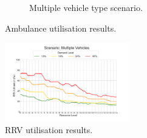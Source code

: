 \documentclass[preprint,12pt]{elsarticle}
\begin{document}
\begin{figure}
\begin{center}
\begin{subfigure}{0.48\textwidth}
    \caption{Multiple vehicle type scenario.}
    \label{fig:results_ambulance_utilisation_multiple} \end{subfigure}
    \end{center} \caption{Ambulance utilisation results.}
    \label{fig:results_ambulance_utilisation} \end{figure}

\begin{figure} \begin{center}
\includegraphics[width=0.48\textwidth]{img/results/multiple_RRVUtilisation}
\end{center} \caption{RRV utilisation results.}
\label{fig:results_rrv_utilisation_multiple} \end{figure}
\end{document}
